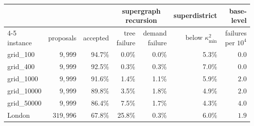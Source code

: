 \begin{tabular}{lrrrrrr}
\toprule
 & & & \multicolumn{2}{c}{supergraph recursion} & superdistrict & base-level \\
\cmidrule(lr){4-5}
instance & proposals & accepted & tree failure & demand failure & below $\kappa^2_{\min}$ & failures per $10^4$ \\
\midrule
grid\_100 & $9{,}999$ & 94.7\% & 0.0\% & 0.0\% & 5.3\% & $0.0$ \\
grid\_400 & $9{,}999$ & 92.5\% & 0.3\% & 0.3\% & 7.0\% & $0.0$ \\
grid\_1000 & $9{,}999$ & 91.6\% & 1.4\% & 1.1\% & 5.9\% & $2.0$ \\
grid\_10000 & $9{,}999$ & 89.8\% & 3.5\% & 1.8\% & 4.9\% & $2.0$ \\
grid\_50000 & $9{,}999$ & 86.4\% & 7.5\% & 1.7\% & 4.3\% & $4.0$ \\
London & $319{,}996$ & 67.8\% & 25.8\% & 0.3\% & 6.0\% & $1.9$ \\
\bottomrule
\end{tabular}
